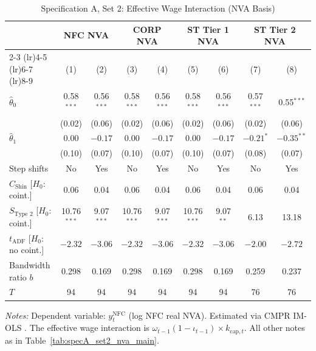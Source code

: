 \begin{table}[htbp]
	\centering
	\caption{Specification A, Set 2: Effective Wage Interaction (NVA Basis)}
	\label{tab:specA_set2_nva_app}
	\small
	\begin{tabular}{@{}lcccccccc@{}}
		\toprule
		& \multicolumn{2}{c}{NFC NVA} & \multicolumn{2}{c}{CORP NVA} & \multicolumn{2}{c}{ST Tier 1 NVA} & \multicolumn{2}{c}{ST Tier 2 NVA} \\
		\cmidrule(lr){2-3} \cmidrule(lr){4-5} \cmidrule(lr){6-7} \cmidrule(lr){8-9}
		& (1) & (2) & (3) & (4) & (5) & (6) & (7) & (8) \\
		\midrule
		$\hat{\theta}_0$ & 0.58$^{***}$ & 0.56$^{***}$ & 0.58$^{***}$ & 0.56$^{***}$ & 0.58$^{***}$ & 0.56$^{***}$ & 0.57$^{***}$ & 0.55$^{***}$ \\
		& (0.02) & (0.06) & (0.02) & (0.06) & (0.02) & (0.06) & (0.02) & (0.06) \\
		$\hat{\theta}_1$ & 0.00 & $-0.17$ & 0.00 & $-0.17$ & 0.00 & $-0.17$ & $-0.21^{*}$ & $-0.35^{**}$ \\
		& (0.10) & (0.07) & (0.10) & (0.07) & (0.10) & (0.07) & (0.08) & (0.07) \\
		\midrule
		Step shifts & No & Yes & No & Yes & No & Yes & No & Yes \\
		$C_{\text{Shin}}$ [$H_0$: coint.] & 0.06 & 0.04 & 0.06 & 0.04 & 0.06 & 0.04 & 0.06 & 0.04 \\
		$S_{\text{Type 2}}$ [$H_0$: coint.] & 10.76$^{***}$ & 9.07$^{***}$ & 10.76$^{***}$ & 9.07$^{***}$ & 10.76$^{***}$ & 9.07$^{**}$ & 6.13 & 13.18 \\
		$t_{\text{ADF}}$ [$H_0$: no coint.] & $-2.32$ & $-3.06$ & $-2.32$ & $-3.06$ & $-2.32$ & $-3.06$ & $-2.00$ & $-2.72$ \\
		Bandwidth ratio $b$ & 0.298 & 0.169 & 0.298 & 0.169 & 0.298 & 0.169 & 0.259 & 0.237 \\
		$T$ & 94 & 94 & 94 & 94 & 94 & 94 & 76 & 76 \\
		\bottomrule
	\end{tabular}
	\begin{minipage}{\textwidth}
		\scriptsize
		\textit{Notes:} Dependent variable: $y_t^{\text{NFC}}$ (log NFC real NVA). Estimated via CMPR IM-OLS \citep{VogelsangWagner2024}. The effective wage interaction is $\omega_{t-1}(1-\iota_{t-1}) \times k_{\text{cap},t}$. All other notes as in Table~\ref{tab:specA_set2_nva_main}.
	\end{minipage}
\end{table}